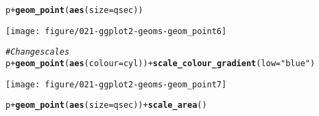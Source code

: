 \documentclass[a4paper,titlepage]{tufte-handout}\usepackage[]{graphicx}\usepackage[]{color}
\makeatletter
\def\maxwidth{ %
  \ifdim\Gin@nat@width>\linewidth
    \linewidth
  \else
    \Gin@nat@width
  \fi
}
\newcommand{\hlstr}[1]{\textcolor[rgb]{0.192,0.494,0.8}{#1}}%
\newcommand{\hlcom}[1]{\textcolor[rgb]{0.678,0.584,0.686}{\textit{#1}}}%
\newcommand{\hlopt}[1]{\textcolor[rgb]{0,0,0}{#1}}%
\newcommand{\hlstd}[1]{\textcolor[rgb]{0.345,0.345,0.345}{#1}}%
\newcommand{\hlkwc}[1]{\textcolor[rgb]{0.333,0.667,0.333}{#1}}%
\newcommand{\hlkwd}[1]{\textcolor[rgb]{0.737,0.353,0.396}{\textbf{#1}}}%
\newenvironment{kframe}{%
 \def\at@end@of@kframe{}%
 \ifinner\ifhmode%
  \def\at@end@of@kframe{\end{minipage}}%
  \begin{minipage}{\columnwidth}%
 \fi\fi%
 \def\FrameCommand##1{\hskip\@totalleftmargin \hskip-\fboxsep
 \colorbox{shadecolor}{##1}\hskip-\fboxsep
     \hskip-\linewidth \hskip-\@totalleftmargin \hskip\columnwidth}%
 \MakeFramed {\advance\hsize-\width
   \@totalleftmargin\z@ \linewidth\hsize
   \@setminipage}}%
 {\par\unskip\endMakeFramed%
 \at@end@of@kframe}
\newenvironment{knitrout}{}{} %
\makeatother
\begin{document}
\begin{knitrout}
\begin{kframe}\begin{alltt}
\hlstd{p} \hlopt{+} \hlkwd{geom_point}\hlstd{(}\hlkwd{aes}\hlstd{(}\hlkwc{size} \hlstd{= qsec))}
\end{alltt}
\end{kframe}
\texttt{[image: figure/021-ggplot2-geoms-geom\_point6]} 
\begin{kframe}\begin{alltt}
\hlcom{# Change scales}
\hlstd{p} \hlopt{+} \hlkwd{geom_point}\hlstd{(}\hlkwd{aes}\hlstd{(}\hlkwc{colour} \hlstd{= cyl))} \hlopt{+} \hlkwd{scale_colour_gradient}\hlstd{(}\hlkwc{low} \hlstd{=} \hlstr{"blue"}\hlstd{)}
\end{alltt}
\end{kframe}
\texttt{[image: figure/021-ggplot2-geoms-geom\_point7]} 
\begin{kframe}\begin{alltt}
\hlstd{p} \hlopt{+} \hlkwd{geom_point}\hlstd{(}\hlkwd{aes}\hlstd{(}\hlkwc{size} \hlstd{= qsec))} \hlopt{+} \hlkwd{scale_area}\hlstd{()}
\end{alltt}



\end{kframe}
\end{knitrout}
\end{document}
